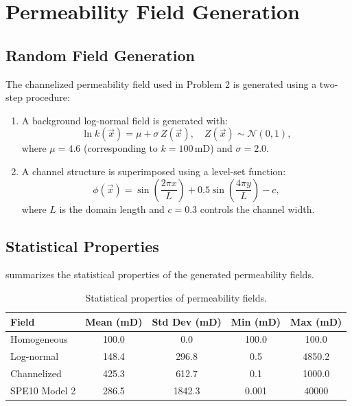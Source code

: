 \chapter{Permeability Field Generation}
\label{app:permeability}

\section{Random Field Generation}
\label{sec:app:randomfield}

The channelized permeability field used in Problem 2 is generated using a two-step procedure:

\begin{enumerate}
    \item A background log-normal field is generated with:
    \begin{equation}
        \ln k(\vec{x}) = \mu + \sigma \, Z(\vec{x}), \quad Z(\vec{x}) \sim \mathcal{N}(0, 1),
        \label{eq:lognormal}
    \end{equation}
    where $\mu = 4.6$ (corresponding to $k = 100$\,mD) and $\sigma = 2.0$.

    \item A channel structure is superimposed using a level-set function:
    \begin{equation}
        \phi(\vec{x}) = \sin\left(\frac{2\pi x}{L}\right) + 0.5 \sin\left(\frac{4\pi y}{L}\right) - c,
        \label{eq:levelset}
    \end{equation}
    where $L$ is the domain length and $c = 0.3$ controls the channel width.
\end{enumerate}

\section{Statistical Properties}
\label{sec:app:statistics}

 summarizes the statistical properties of the generated permeability fields.

\begin{table}[htbp]
    \centering
    \caption{Statistical properties of permeability fields.}
    \label{tab:permeability_stats}
    \begin{tabular}{@{}lcccc@{}}
        \toprule
        \textbf{Field} & \textbf{Mean (mD)} & \textbf{Std Dev (mD)} & \textbf{Min (mD)} & \textbf{Max (mD)} \\
        \midrule
        Homogeneous      & 100.0  & 0.0     & 100.0  & 100.0  \\
        Log-normal       & 148.4  & 296.8   & 0.5    & 4850.2 \\
        Channelized      & 425.3  & 612.7   & 0.1    & 1000.0 \\
        SPE10 Model 2    & 286.5  & 1842.3  & 0.001  & 40000  \\
        \bottomrule
    \end{tabular}
\end{table}

